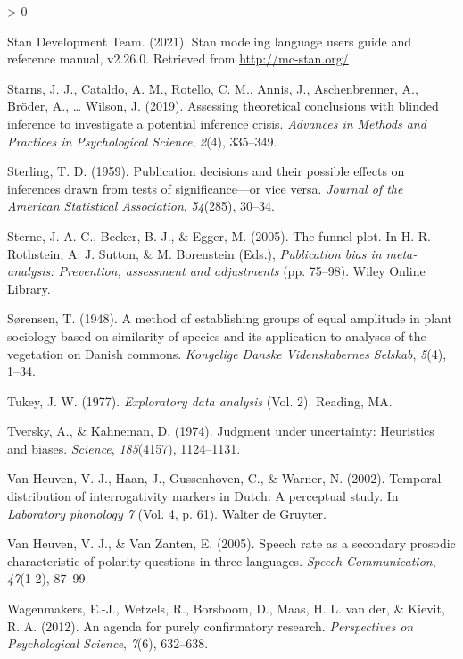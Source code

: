 \documentclass[
  english,
  man,floatsintext]{apa6}
\newlength{\cslhangindent}
\newenvironment{CSLReferences}[2] %
 {%
  \setlength{\parindent}{0pt}
  \ifodd #1 \everypar{\setlength{\hangindent}{\cslhangindent}}\ignorespaces\fi
  \ifnum #2 > 0
  \setlength{\parskip}{#2\baselineskip}
  \fi
 }%
 {}
\begin{document}
\begin{CSLReferences}{1}{0}
\leavevmode\hypertarget{ref-stan2021}{}%
Stan Development Team. (2021). Stan modeling language users guide and reference manual, v2.26.0. Retrieved from \url{http://mc-stan.org/}

\leavevmode\hypertarget{ref-starns2019assessing}{}%
Starns, J. J., Cataldo, A. M., Rotello, C. M., Annis, J., Aschenbrenner, A., Bröder, A., \ldots{} Wilson, J. (2019). Assessing theoretical conclusions with blinded inference to investigate a potential inference crisis. \emph{Advances in Methods and Practices in Psychological Science}, \emph{2}(4), 335--349.

\leavevmode\hypertarget{ref-sterling1959publication}{}%
Sterling, T. D. (1959). Publication decisions and their possible effects on inferences drawn from tests of significance---or vice versa. \emph{Journal of the American Statistical Association}, \emph{54}(285), 30--34.

\leavevmode\hypertarget{ref-sterne2005}{}%
Sterne, J. A. C., Becker, B. J., \& Egger, M. (2005). The funnel plot. In H. R. Rothstein, A. J. Sutton, \& M. Borenstein (Eds.), \emph{Publication bias in meta-analysis: Prevention, assessment and adjustments} (pp. 75--98). Wiley Online Library.

\leavevmode\hypertarget{ref-sorensen1948}{}%
Sørensen, T. (1948). A method of establishing groups of equal amplitude in plant sociology based on similarity of species and its application to analyses of the vegetation on {D}anish commons. \emph{Kongelige Danske Videnskabernes Selskab}, \emph{5}(4), 1--34.

\leavevmode\hypertarget{ref-tukey1977exploratory}{}%
Tukey, J. W. (1977). \emph{Exploratory data analysis} (Vol. 2). Reading, MA.

\leavevmode\hypertarget{ref-tversky1974judgment}{}%
Tversky, A., \& Kahneman, D. (1974). Judgment under uncertainty: Heuristics and biases. \emph{Science}, \emph{185}(4157), 1124--1131.

\leavevmode\hypertarget{ref-heuven2002}{}%
Van Heuven, V. J., Haan, J., Gussenhoven, C., \& Warner, N. (2002). Temporal distribution of interrogativity markers in {D}utch: A perceptual study. In \emph{Laboratory phonology 7} (Vol. 4, p. 61). Walter de Gruyter.

\leavevmode\hypertarget{ref-van2005speech}{}%
Van Heuven, V. J., \& Van Zanten, E. (2005). Speech rate as a secondary prosodic characteristic of polarity questions in three languages. \emph{Speech Communication}, \emph{47}(1-2), 87--99.

\leavevmode\hypertarget{ref-wagenmakers2012agenda}{}%
Wagenmakers, E.-J., Wetzels, R., Borsboom, D., Maas, H. L. van der, \& Kievit, R. A. (2012). An agenda for purely confirmatory research. \emph{Perspectives on Psychological Science}, \emph{7}(6), 632--638.


\end{CSLReferences}
\end{document}
